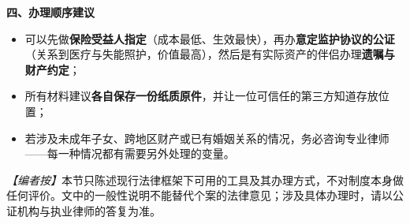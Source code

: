 \textbf{四、办理顺序建议}
\begin{itemize}
\item 可以先做\textbf{保险受益人指定}（成本最低、生效最快），再办\textbf{意定监护协议的公证}（关系到医疗与失能照护，价值最高），然后是有实际资产的伴侣办理\textbf{遗嘱与财产约定}；
\item 所有材料建议\textbf{各自保存一份纸质原件}，并让一位可信任的第三方知道存放位置；
\item 若涉及未成年子女、跨地区财产或已有婚姻关系的情况，务必咨询专业律师——每一种情况都有需要另外处理的变量。
\end{itemize}

\noindent\textit{【编者按】}本节只陈述现行法律框架下可用的工具及其办理方式，不对制度本身做任何评价。文中的一般性说明不能替代个案的法律意见；涉及具体办理时，请以公证机构与执业律师的答复为准。
